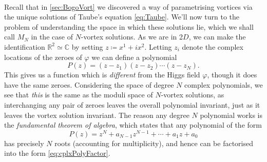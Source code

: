 \documentclass[11pt, fleqn]{article}
\begin{document}
\paragraph{}Recall that in \cref{sec:BogoVort} we discovered a way of parametrising vortices via the unique solutions of Taube's equation \eqref{eq:Taube}. We'll now turn to the problem of understanding the space in which these solutions lie, which we shall call $ M_N $ in the case of $ N $-vortex solutions. As we are in 2$ D $, we can make the identification $ \mathbb{R}^2 \simeq \mathbb{C} $ by setting $ z \coloneqq x^1 + i x^2 $. Letting $ z_i $ denote the complex locations of the zeroes of $ \varphi $ we can define a polynomial
	\begin{equation}\label{eq:cplxPolyFactor}
		P(z) = (z-z_1)(z-z_2)\cdots(z-z_N).
	\end{equation}
This gives us a function which is \textit{different} from the Higgs field $ \varphi $, though it does have the same zeroes. Considering the space of degree $ N $ complex polynomials, we see that \textit{this} is the same as the moduli space of $ N $-vortex solutions, as interchanging any pair of zeroes leaves the overall polynomial invariant, just as it leaves the vortex solution invariant. The reason any degree $ N $ polynomial works is the \textit{fundamental theorem of algebra}, which states that any polynomial of the form
	\begin{equation}\label{eq:cplxPolyLong}
		P(z) = z^N + a_{N-1} z^{N-1} + \cdots + a_1 z + a_0
	\end{equation}
has precisely $ N $ roots (accounting for multiplicity), and hence can be factorised into the form \eqref{eq:cplxPolyFactor}.
\end{document}
